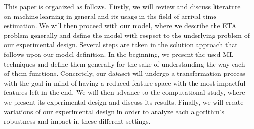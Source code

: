 This paper is organized as follows. Firstly, we will review and discuss literature on machine learning in general and its usage in the field of arrival time estimation. We will then proceed with our model, where we describe the ETA problem generally and define the model with respect to the underlying problem of our experimental design. Several steps are taken in the solution approach that follows upon our model definition. In the beginning, we present the used ML techniques and define them generally for the sake of understanding the way each of them functions. Concretely, our dataset will undergo a transformation process with the goal in mind of having a reduced feature space with the most impactful features left in the end. We will then advance to the computational study, where we present its experimental design and discuss its results. Finally, we will create variations of our experimental design in order to analyze each algorithm’s robustness and impact in these different settings.